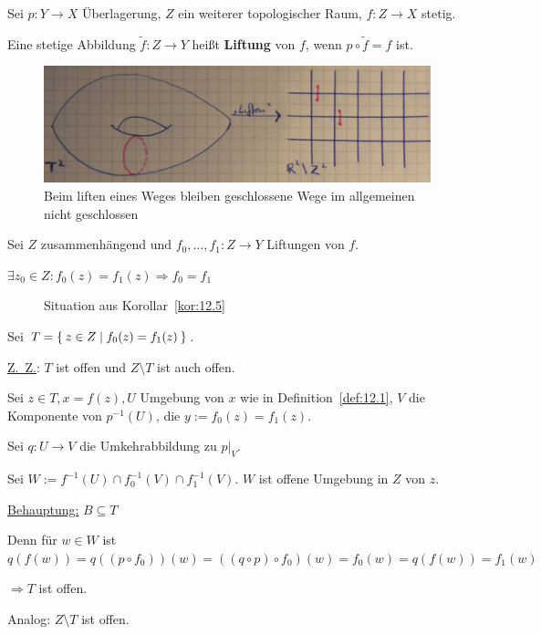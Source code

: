 \begin{definition}
    Sei $p: Y \rightarrow X$ Überlagerung, $Z$ ein weiterer topologischer
    Raum, $f:Z \rightarrow X$ stetig.

    Eine stetige Abbildung $\tilde{f}: Z \rightarrow Y$ heißt
    \textbf{Liftung} von $f$, wenn $p \circ \tilde{f} = f$ ist.
\end{definition}

\begin{figure}
    \centering
    \includegraphics[width=\linewidth, keepaspectratio]{figures/todo/liftung-torus-r.jpg}
    \caption{Beim liften eines Weges bleiben geschlossene Wege im allgemeinen nicht geschlossen}
    \label{fig:satz-seifert-van-kampen}
\end{figure}

\begin{korollar}\label{kor:12.5}%
    Sei $Z$ zusammenhängend und $f_0, \dots, f_1: Z \rightarrow Y$
    Liftungen von $f$.

    $\exists z_0 \in Z: f_0(z) = f_1(z) \Rightarrow f_0 = f_1$
\end{korollar}

\begin{figure}
    \centering
    
    \caption{Situation aus Korollar~\ref{kor:12.5}}
    \label{fig:situation-kor-12.5}
\end{figure}

\begin{beweis}
    Sei $T = \Set{z \in Z | f_0(z) = f_1(z)}$.

    \underline{Z.~Z.}: $T$ ist offen und $Z \setminus T$ ist auch offen.

    Sei $z \in T, x = f(z), U$ Umgebung von $x$ wie in Definition~\ref{def:12.1},
    $V$ die Komponente von $p^{-1}(U)$, die $y:=f_0(z) = f_1(z)$.

    Sei $q:U \rightarrow V$ die Umkehrabbildung zu $p|_V$.

    Sei $W:= f^{-1}(U) \cap f_0^{-1}(V) \cap f_1^{-1}(V)$. $W$ ist 
    offene Umgebung in $Z$ von $z$.

    \underline{Behauptung:} $B \subseteq T$

    Denn für $w \in W$ ist $q(f(w)) = q((p \circ f_0))(w) = ((q \circ p) \circ f_0) (w) = f_0(w) = q(f(w)) = f_1(w)$

    $\Rightarrow T$ ist offen.

    Analog: $Z \setminus T$ ist offen.
\end{beweis}

